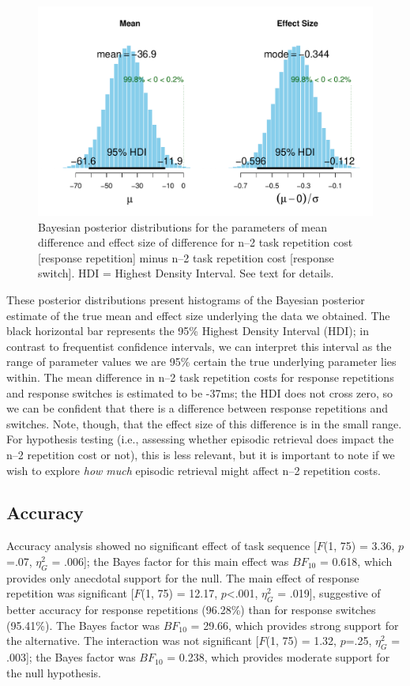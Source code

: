 \documentclass[a4paper, man, natbib]{apa6}
\begin{document}
\begin{figure}
\begin{center}
\includegraphics[width = \textwidth]{Images/bayesParameter.pdf}
\caption{Bayesian posterior distributions for the parameters of mean difference and effect size of difference for n--2 task repetition cost [response repetition] minus n--2 task repetition cost [response switch]. HDI = Highest Density Interval. See text for details.}
\label{fig:bayesParameter}
\end{center}
\end{figure}

These posterior distributions present histograms of the Bayesian posterior estimate of the true mean and effect size underlying the data we obtained. The black horizontal bar represents the 95\% Highest Density Interval (HDI); in contrast to frequentist confidence intervals, we can interpret this interval as the range of parameter values we are 95\% certain the true underlying parameter lies within. The mean difference in n--2 task repetition costs for response repetitions and response switches is estimated to be -37ms; the HDI does not cross zero, so we can be confident that there is a difference between response repetitions and switches. Note, though, that the effect size of this difference is in the small range. For hypothesis testing (i.e., assessing whether episodic retrieval does impact the n--2 repetition cost or not), this is less relevant, but it is important to note if we wish to explore \emph{how much} episodic retrieval might affect n--2 repetition costs.

\subsection{Accuracy}
Accuracy analysis showed no significant effect of task sequence [$F$(1, 75) = 3.36, $p$=.07, $\eta_G^2$ = .006]; the Bayes factor for this main effect was $BF_{10}$ = 0.618, which provides only anecdotal support for the null. The main effect of response repetition was significant [$F$(1, 75) = 12.17, $p$<.001, $\eta_G^2$ = .019], suggestive of better accuracy for response repetitions (96.28\%) than for response switches (95.41\%). The Bayes factor was $BF_{10}$ = 29.66, which provides strong support for the alternative. The interaction was not significant [$F$(1, 75) = 1.32, $p$=.25, $\eta_G^2$ = .003]; the Bayes factor was $BF_{10}$ = 0.238, which provides moderate support for the null hypothesis.
\end{document}
